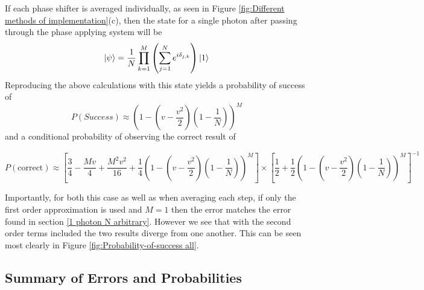 \documentclass[aps,pra,twocolumn,superscriptaddress,numerical,floatfix]{revtex4-1}
\begin{document}
If each phase shifter is averaged individually, as seen in Figure \ref{fig:Different methods of implementation}(c), then the state for a single photon after passing through the phase applying system will be
\begin{equation}
	\ket{\psi}=\frac{1}{N}\prod_{k=1}^{M}\left(\sum_{j=1}^{N}e^{i\delta_{j,k}}\right)\ket{1}\label{eq:AveStepPhaseState}
\end{equation}
Reproducing the above calculations with this state yields a probability of success of
\begin{equation}
P\left(Success\right)\approx\left(1-\left(v-\frac{v^{2}}{2}\right)\left(1-\frac{1}{N}\right)\right)^{M}\label{eq:AvStepProbSuccess}
\end{equation}
and a conditional probability of observing the correct result of
\begin{widetext}
\begin{equation}
P(\textrm{correct}) \approx  \left[\frac{3}{4}-\frac{Mv}{4}+\frac{M^{2}v^{2}}{16}+\frac{1}{4}\left(1-\left(v-\frac{v^{2}}{2}\right)\left(1-\frac{1}{N}\right)\right)^{M}\right]\nonumber\times\left[\frac{1}{2}+\frac{1}{2}\left(1-\left(v-\frac{v^{2}}{2}\right)\left(1-\frac{1}{N}\right)\right)^{M}\right]^{-1}\label{eq:ErrorAvStep}
\end{equation}
\end{widetext}
Importantly, for both this case as well as when averaging each step, if only the first order approximation is used and $M=1$ then the error matches the error found in section \ref{1 photon N arbitrary}. However we see that with the second order terms included the two results diverge from one another. This can be seen most clearly in Figure \ref{fig:Probability-of-success all}.

\subsection{Summary of Errors and Probabilities\label{Summary of Errors and Probabilities}}
\end{document}
